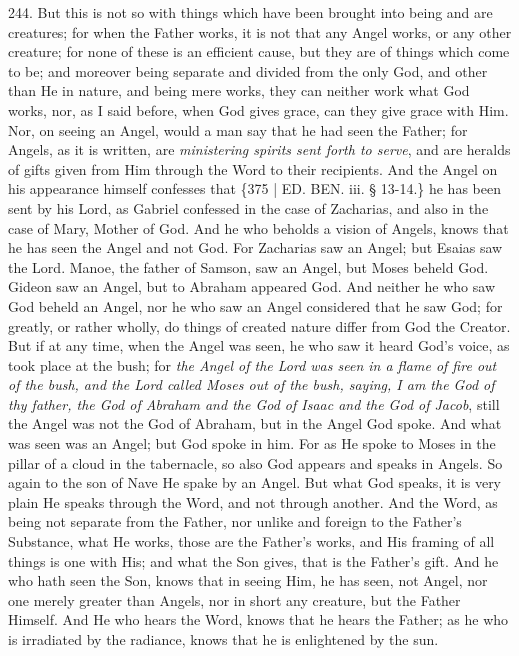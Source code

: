 244. But this
is not so with things which have been brought into being and are
creatures; for when the Father works, it is not that any Angel works,
or any other creature; for none of these is an efficient cause, but
they are of things which come to be; and moreover being separate and
divided from the only God, and other than He in nature, and being mere
works, they can neither work what God works, nor, as I said before,
when God gives grace, can they give grace with Him. Nor, on seeing an
Angel, would a man say that he had seen the Father; for Angels, as it
is written, are \emph{ministering spirits sent forth to serve}, and
are heralds of gifts given from Him through the Word to their
recipients. And the Angel on his appearance himself confesses that
\{375 | ED.
BEN.
iii. § 13-14.\} he has been sent by his Lord, as Gabriel confessed in
the case of Zacharias, and also in the case of Mary, Mother of God.
And he who beholds a vision of Angels, knows that he has seen the
Angel and not God. For Zacharias saw an Angel; but Esaias saw the
Lord. Manoe, the father of Samson, saw an Angel, but Moses beheld God.
Gideon saw an Angel, but to Abraham appeared God. And neither he who
saw God beheld an Angel, nor he who saw an Angel considered that he
saw God; for greatly, or rather wholly, do things of created nature
differ from God the Creator. But if at any time, when the Angel was
seen, he who saw it heard God's voice, as took place at the bush; for \emph{the
Angel of the Lord was seen in a flame of fire out of the bush, and the
Lord called Moses out of the bush, saying, I am the God of thy father,
the God of Abraham and the God of Isaac and the God of Jacob},
still the Angel was not the God of Abraham, but in the Angel God
spoke. And what was seen was an Angel; but God spoke in him. For as He
spoke to Moses in the pillar of a cloud in the tabernacle, so also God
appears and speaks in Angels. So again to the son of Nave He spake by
an Angel. But what God speaks, it is very plain He speaks through the
Word, and not through another. And the Word, as being not separate
from the Father, nor unlike and foreign to the Father's Substance,
what He works, those are the Father's works, and His framing of all
things is one with His; and what the Son gives, that is the Father's
gift. And he who hath seen the Son, knows that in seeing Him, he has
seen, not Angel, nor one merely greater than Angels, nor in short any
creature, but the Father Himself. And He who hears the Word, knows
that he hears the Father; as he who is irradiated by the radiance,
knows that he is enlightened by the sun.


